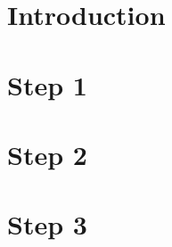 \documentclass[english,11pt]{article}
\begin{document}
\onehalfspacing


\tableofcontents
\newpage

\section{Introduction}

\newpage

\section{Step 1}

\newpage

\section{Step 2}

\newpage

\section{Step 3}

\newpage
\end{document}
